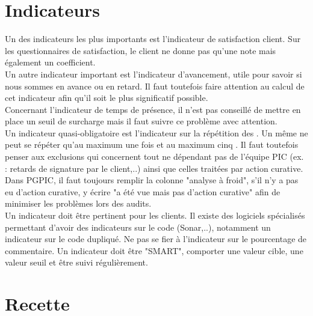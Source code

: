 \documentclass [a4paper] {article}
\begin{document}
\section{Indicateurs}
Un des indicateurs les plus importants est l'indicateur de satisfaction client. Sur les questionnaires de satisfaction, le client ne donne pas qu'une note mais également un coefficient.
\\
Un autre indicateur important est l'indicateur d'avancement, utile pour savoir si nous sommes en avance ou en retard. Il faut toutefois faire attention au calcul de cet indicateur afin qu'il soit le plus significatif possible.
\\
Concernant l'indicateur de temps de présence, il n'est pas conseillé de mettre en place un seuil de surcharge mais il faut suivre ce problème avec attention.
\\
Un indicateur quasi-obligatoire est l'indicateur sur la répétition des \FTCourt{}. Un même \FT{} ne peut se répéter qu'au maximum une fois et au maximum cinq \FTCourt{}. Il faut toutefois penser aux exclusions qui concernent tout \FTCourt{} ne dépendant pas de l'équipe PIC (ex. : retards de signature par le client,..) ainsi que celles traitées par action curative. Dans PGPIC, il faut toujours remplir la colonne "analyse à froid", s'il n'y a pas eu d'action curative, y écrire "a été vue mais pas d'action curative" afin de minimiser les problèmes lors des audits.
\\
Un indicateur doit être pertinent pour les clients. Il existe des logiciels spécialisés permettant d'avoir des indicateurs sur le code (Sonar,..), notamment un indicateur sur le code dupliqué. Ne pas se fier à l'indicateur sur le pourcentage de commentaire. Un indicateur doit être "SMART", comporter une valeur cible, une valeur seuil et être suivi régulièrement.

\section{Recette}
\end{document}
